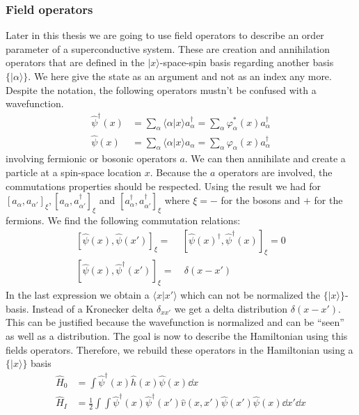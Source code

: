 \documentclass[../main.tex]{subfile}
\begin{document}
\subsubsection{Field operators}
Later in this thesis we are going to use field operators to describe an order parameter of a superconductive system. These are 
creation and annihilation operators that are defined in the $|x\rangle$-space-spin basis regarding another basis $\{|\alpha\rangle\}$. We here give the state as an argument
and not as an index any more. Despite the notation, the following operators mustn't be confused with a wavefunction.
\begin{align}
    \hat{\psi}^{\dagger}(x) &= \sum_{\alpha} \langle\alpha|x\rangle a_{\alpha}^{\dagger} = \sum_{\alpha} \varphi_{\alpha}^{\ast}(x) a_{\alpha}^{\dagger} \label{eq:FieldOp}\\ 
    \hat{\psi}(x) &= \sum_{\alpha} \langle\alpha|x\rangle a_{\alpha} = \sum_{\alpha} \varphi_{\alpha}(x) a_{\alpha}^{\dagger}\label{eq:FieldOpDag}
\end{align}
involving fermionic or bosonic operators $a$. We can then annihilate and create a particle at a spin-space location $x$. Because the $a$ operators
are involved, the commutations properties should be respected. Using the result we had for $[a_{\alpha}, a_{\alpha'}]_{\xi},
[a_{\alpha}, a_{\alpha'}^{\dagger}]_{\xi}$ and $[a_{\alpha}^{\dagger}, a_{\alpha'}^{\dagger}]_{\xi}$ where $\xi = -$ for the bosons and $+$ for the fermions. We find the following commutation relations:
\begin{align*}
    \left[\hat{\psi}(x), \hat{\psi}(x')\right]_{\xi} = & \left[\hat{\psi}(x)^{\dagger}, \hat{\psi}^{\dagger}(x)\right]_{\xi} = 0 \\
    \left[\hat{\psi}(x), \hat{\psi}^{\dagger}(x')\right]_{\xi} = &~ \delta(x-x')
\end{align*}
In the last expression we obtain a $\langle x | x '\rangle$ which can not be normalized the $\{|x\rangle\}$-basis. Instead of a Kronecker delta $\delta_{xx'}$
we get a delta distribution $\delta(x-x')$. This can be justified because the wavefunction is normalized and can be ``seen'' as well as a distribution.
The goal is now to describe the Hamiltonian using this fields operators. Therefore, we rebuild these operators in the Hamiltonian using a $\{|x\rangle\}$ basis
\begin{align*}
    \hat{H}_0 &=  \int \hat{\psi}^{\dagger}(x) \hat{h}(x)\hat{\psi}(x) \dd x\\
    \hat{H}_I &= \frac{1}{2} \int \int  \hat{\psi}^{\dagger}(x) \hat{\psi}^{\dagger}(x') \hat{v}(x,x')\hat{\psi}(x') \hat{\psi}(x) \dd x' \dd x
\end{align*}
\end{document}
